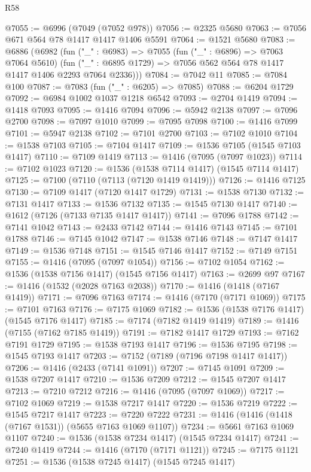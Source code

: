 \begin{lexlean}{R58}
\begin{coremodule}
{{@7055 := @6996 (@7049 (@7052 @978))
@7056 := @2325 @5680
@7063 := @7056 @671 @564 @78 @1417 @1417 @1406 @5591
@7064 := @1521 @5680
@7083 := @6886
    (@6982
      (fun ("_" : @6983) =>
      @7055
        (fun ("_" : @6896) => @7063 @7064 @5610)
        (fun ("_" : @6895 @1729) => @7056 @562 @564 @78 @1417 @1417 @1406 @2293 @7064 @2336)))
@7084 := @7042 @11
@7085 := @7084 @100
@7087 := @7083 (fun ("_" : @6205) => @7085)
@7088 := @6204 @1729
@7092 := @6984 @1002 @1037 @1218 @6542
@7093 := @2704 @1419
@7094 := @1418 @7093
@7095 := @1416 @7094
@7096 := @5942 @2138
@7097 := @7096 @2700
@7098 := @7097 @1010
@7099 := @7095 @7098
@7100 := @1416 @7099
@7101 := @5947 @2138
@7102 := @7101 @2700
@7103 := @7102 @1010
@7104 := @1538 @7103
@7105 := @7104 @1417
@7109 := @1536 @7105 (@1545 @7103 @1417)
@7110 := @7109 @1419
@7113 := @1416 (@7095 (@7097 @1023))
@7114 := @7102 @1023
@7120 := @1536 (@1538 @7114 @1417) (@1545 @7114 @1417)
@7125 := @7100 (@7110 (@7113 (@7120 @1419 @1419)))
@7126 := @1416 @7125
@7130 := @7109 @1417 (@7120 @1417 @1729)
@7131 := @1538 @7130
@7132 := @7131 @1417
@7133 := @1536 @7132
@7135 := @1545 @7130 @1417
@7140 := @1612 (@7126 (@7133 @7135 @1417 @1417))
@7141 := @7096 @1788
@7142 := @7141 @1042
@7143 := @2433 @7142
@7144 := @1416 @7143
@7145 := @7101 @1788
@7146 := @7145 @1042
@7147 := @1538 @7146
@7148 := @7147 @1417
@7149 := @1536 @7148
@7151 := @1545 @7146 @1417
@7152 := @7149 @7151
@7155 := @1416 (@7095 (@7097 @1054))
@7156 := @7102 @1054
@7162 := @1536 (@1538 @7156 @1417) (@1545 @7156 @1417)
@7163 := @2699 @97
@7167 := @1416 (@1532 (@2028 @7163 @2038))
@7170 := @1416 (@1418 (@7167 @1419))
@7171 := @7096 @7163
@7174 := @1416 (@7170 (@7171 @1069))
@7175 := @7101 @7163
@7176 := @7175 @1069
@7182 := @1536 (@1538 @7176 @1417) (@1545 @7176 @1417)
@7185 := @7174 (@7182 @1419 @1419)
@7189 := @1416 (@7155 (@7162 @7185 @1419))
@7191 := @7182 @1417 @1729
@7193 := @7162 @7191 @1729
@7195 := @1538 @7193 @1417
@7196 := @1536 @7195
@7198 := @1545 @7193 @1417
@7203 := @7152 (@7189 (@7196 @7198 @1417 @1417))
@7206 := @1416 (@2433 (@7141 @1091))
@7207 := @7145 @1091
@7209 := @1538 @7207 @1417
@7210 := @1536 @7209
@7212 := @1545 @7207 @1417
@7213 := @7210 @7212
@7216 := @1416 (@7095 (@7097 @1069))
@7217 := @7102 @1069
@7219 := @1538 @7217 @1417
@7220 := @1536 @7219
@7222 := @1545 @7217 @1417
@7223 := @7220 @7222
@7231 := @1416 (@1416 (@1418 (@7167 @1531)) (@5655 @7163 @1069 @1107))
@7234 := @5661 @7163 @1069 @1107
@7240 := @1536 (@1538 @7234 @1417) (@1545 @7234 @1417)
@7241 := @7240 @1419
@7244 := @1416 (@7170 (@7171 @1121))
@7245 := @7175 @1121
@7251 := @1536 (@1538 @7245 @1417) (@1545 @7245 @1417)
}}
\end{coremodule}
\end{lexlean}
